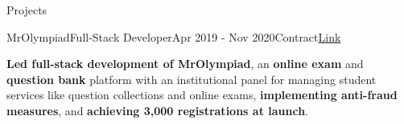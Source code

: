\documentclass[]{kyvernitis-resume}
\begin{document}
\begin{section}{Projects}
    \begin{subsection}{MrOlympiad}{Full-Stack Developer}{Apr 2019 - Nov 2020}{Contract}{\href{http://mrolympiad.ir}{Link}}
		\item \textbf{Led full-stack development of MrOlympiad}, an \textbf{online exam} and \textbf{question bank} platform with an institutional panel for managing student services like question collections and online exams, \textbf{implementing anti-fraud measures}, and \textbf{achieving 3,000 registrations at launch}.

    \end{subsection}
    
\end{section}


\end{document}
